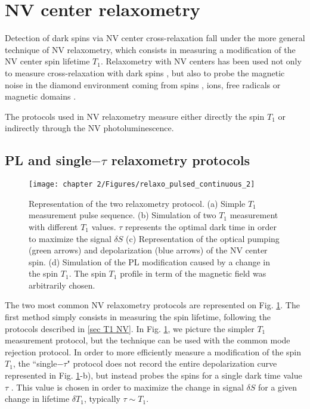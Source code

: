 \documentclass[a4paper, 11pt]{report}
\begin{document}
\section{NV center relaxometry}

Detection of dark spins via NV center cross-relaxation fall under the more general technique of NV relaxometry, which consists in measuring a modification of the NV center spin lifetime $T_1$. Relaxometry with NV centers has been used not only to measure cross-relaxation with dark spins \citep{van1989cross, holliday1989optical, epstein2005anisotropic, armstrong2010nv,   hall2016detection, wickenbrock2016microwave,  wood2016wide,  alfasi2019detection, lazda2021cross}, but also to probe the magnetic noise in the diamond environment coming from spins \citep{steinert2013magnetic}, ions\citep{tetienne2013spin}, free radicals \citep{nie2021quantum}or magnetic domains \citep{finco2021imaging}. 

The protocols used in NV relaxometry measure either directly the spin $T_1$ or indirectly through the NV photoluminescence.

\subsection{PL and single$-\tau$ relaxometry protocols}
\begin{figure}[h]
\centering
\texttt{[image: chapter 2/Figures/relaxo\_pulsed\_continuous\_2]}
\caption{Representation of the two relaxometry protocol. (a) Simple $T_1$ measurement pulse sequence. (b) Simulation of two $T_1$ measurement with different $T_1$ values. $\tau$ represents the optimal dark time in order to maximize the signal $\delta S$ (c) Representation of the optical pumping (green arrows) and depolarization (blue arrows) of the NV center spin. (d) Simulation of the PL modification caused by a change in the spin $T_1$. The spin $T_1$ profile in term of the magnetic field was arbitrarily chosen.}
\label{T1 vs PL}
\end{figure}

The two most common NV relaxometry protocols are represented on Fig. \ref{T1 vs PL}. The first method simply consists in measuring the spin lifetime, following the protocols described in \ref{sec T1 NV}. In Fig. \ref{T1 vs PL}, we picture the simpler $T_1$ measurement protocol, but the technique can be used with the common mode rejection protocol. In order to more efficiently measure a modification of the spin $T_1$, the ``single$-\tau$" protocol does not record the entire depolarization curve represented in Fig. \ref{T1 vs PL}-b), but instead probes the spins for a single dark time value $\tau$ \citep{pelliccione2014two, schmid2015relaxometry, tetienne2016scanning}. This value is chosen in order to maximize the change in signal $\delta S$ for a given change in lifetime $\delta T_1$, typically $\tau \sim T_1$.
\end{document}

